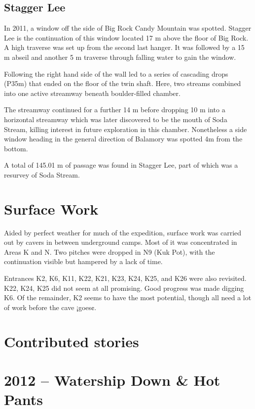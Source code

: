 \hypertarget{stagger-lee}{%
\subsection{Stagger Lee}\label{stagger-lee}}

In 2011, a window off the side of Big Rock Candy Mountain was spotted.
Stagger Lee is the continuation of this window located 17 m above the
floor of Big Rock. A high traverse was set up from the second last
hanger. It was followed by a 15 m abseil and another 5 m traverse
through falling water to gain the window.

Following the right hand side of the wall led to a series of cascading
drops (P35m) that ended on the floor of the twin shaft. Here, two
streams combined into one active streamway beneath boulder-filled
chamber.

The streamway continued for a further 14 m before dropping 10 m into a
horizontal streamway which was later discovered to be the mouth of Soda
Stream, killing interest in future exploration in this chamber.
Nonetheless a side window heading in the general direction of Balamory
was spotted 4m from the bottom.

A total of 145.01 m of passage was found in Stagger Lee, part of which
was a resurvey of Soda Stream.

\hypertarget{surface-work}{%
\section{Surface Work}\label{surface-work}}

Aided by perfect weather for much of the expedition, surface work was
carried out by cavers in between underground camps. Most of it was
concentrated in Areas K and N. Two pitches were dropped in N9 (Kuk Pot),
with the continuation visible but hampered by a lack of time.

Entrances K2, K6, K11, K22, K21, K23, K24, K25, and K26 were also
revisited. K22, K24, K25 did not seem at all promising. Good progress
was made digging K6. Of the remainder, K2 seems to have the most
potential, though all need a lot of work before the cave ¡goes¢.

\hypertarget{contributed-stories-1}{%
\section{Contributed stories}\label{contributed-stories-1}}

\hypertarget{watership-down-hot-pants}{%
\section{2012 -- Watership Down \& Hot
Pants}\label{watership-down-hot-pants}}

